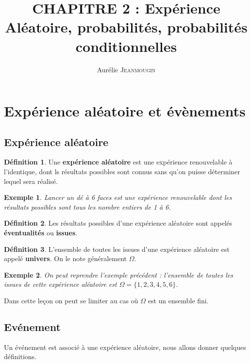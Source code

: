 \documentclass[a4paper,12pt]{article}
\title{CHAPITRE 2 : Expérience Aléatoire, probabilités, probabilités conditionnelles}
\author{Aurélie \textsc{Jeanmougin}}
\newtheorem{Ex}{Exemple}[section]
\theoremstyle{theorem}
\theoremstyle{definition}
\theoremstyle{definition}
\theoremstyle{definition}
\newtheorem{Def}{Définition}[section]
\begin{document}
	
	\maketitle

\section{Expérience aléatoire et évènements}
	\subsection{Expérience aléatoire}
		\begin{Def}
			Une \textbf{expérience aléatoire} est une expérience renouvelable à l'identique, dont ls résultats possibles sont connus sans qu'on puisse déterminer lequel sera réalisé.
		\end{Def}
	
		\begin{Ex}
			Lancer un dé à 6 faces est une expérience renouvelable dont les résultats possibles sont tous les nombre entiers de 1 à 6.
		\end{Ex}
	
		\begin{Def}
			Les résultats possibles d'une expérience aléatoire sont appelés \textbf{éventualités} ou \textbf{issues}.
		\end{Def}
	
		\begin{Def}
			L'ensemble de toutes les issues d'une expérience aléatoire est appelé \textbf{univers}. On le note généralement $\Omega$.
		\end{Def}
		
		\begin{Ex}
			On peut reprendre l'exemple précédent : l'ensemble de toutes les issues de cette expérience aléatoire est $\Omega = \{1,2,3,4,5,6\}$.
		\end{Ex}
	
	Dans cette leçon on peut se limiter au cas où $\Omega$ est un ensemble fini.
	
	\subsection{Evénement}
		
		Un événement est associé à une expérience aléatoire, nous allons donner quelques définitions.
		
\end{document}
